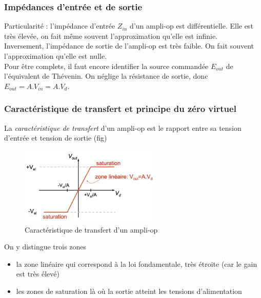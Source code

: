\documentclass[a4paper]{article}
\begin{document}
    \subsubsection{Impédances d'entrée et de sortie}
    Particularité : l'impédance d'entrée $Z_{in}$ d'un ampli-op est différentielle.
    Elle est très élevée, on fait même souvent l'approximation qu'elle est infinie.\\

    Inversement, l'impédance de sortie de l'ampli-op est très faible. On fait
    souvent l'approximation qu'elle est nulle.\\

    Pour être complets, il faut encore identifier la source commandée $E_{out}$
    de l'équivalent de Thévenin. On néglige la résistance de sortie, donc 
    $E_{out} = A.V_{in} = A.V_d$.

    \subsubsection{Caractéristique de transfert et principe du zéro virtuel}
    La \textit{caractéristique de transfert} d'un ampli-op est le rapport entre
    sa tension d'entrée et tension de sortie (fig) 

    \begin{figure}[H]
        \begin{center}
            \includegraphics[width=0.6\textwidth]{fig/4_cartransfert.png}
            \caption{Caractéristique de transfert d'un ampli-op}
            \label{fig:4_cartransfert}
        \end{center}
    \end{figure}

    On y distingue trois zones
    \begin{itemize}
        \item la zone linéaire qui correspond à la loi fondamentale, très étroite
        (car le gain est très élevé)
        \item les zones de saturation là où la sortie atteint les tensions d'alimentation
    \end{itemize}
\end{document}
